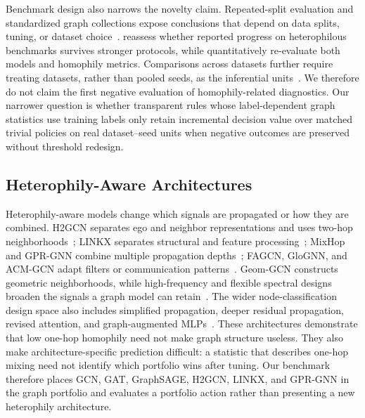 Benchmark design also narrows the novelty claim. Repeated-split evaluation and standardized graph collections expose conclusions that depend on data splits, tuning, or dataset choice~\citep{shchur2018pitfalls,hu2020ogb}. \citet{platonov2023heterophilous} reassess whether reported progress on heterophilous benchmarks survives stronger protocols, while \citet{luan2024reevaluating} quantitatively re-evaluate both models and homophily metrics. Comparisons across datasets further require treating datasets, rather than pooled seeds, as the inferential units~\citep{demsar2006statistical}. We therefore do not claim the first negative evaluation of homophily-related diagnostics. Our narrower question is whether transparent rules whose label-dependent graph statistics use training labels only retain incremental decision value over matched trivial policies on real dataset--seed units when negative outcomes are preserved without threshold redesign.

\subsection{Heterophily-Aware Architectures}

Heterophily-aware models change which signals are propagated or how they are combined. H2GCN separates ego and neighbor representations and uses two-hop neighborhoods~\citep{zhu2020beyond}; LINKX separates structural and feature processing~\citep{lim2021linkx}; MixHop and GPR-GNN combine multiple propagation depths~\citep{abu2019mixhop,chien2021gprgnn}; FAGCN, GloGNN, and ACM-GCN adapt filters or communication patterns~\citep{fagcn2021,li2022glognn,luan2022linkx}. Geom-GCN constructs geometric neighborhoods, while high-frequency and flexible spectral designs broaden the signals a graph model can retain~\citep{pei2020geomgcn,he2022bernnet,wang2022jacobi}. The wider node-classification design space also includes simplified propagation, deeper residual propagation, revised attention, and graph-augmented MLPs~\citep{wu2019sgc,chen2020gcnii,brody2022gatv2,zhang2021gamlp}. These architectures demonstrate that low one-hop homophily need not make graph structure useless. They also make architecture-specific prediction difficult: a statistic that describes one-hop mixing need not identify which portfolio wins after tuning. Our benchmark therefore places GCN, GAT, GraphSAGE, H2GCN, LINKX, and GPR-GNN in the graph portfolio and evaluates a portfolio action rather than presenting a new heterophily architecture.


